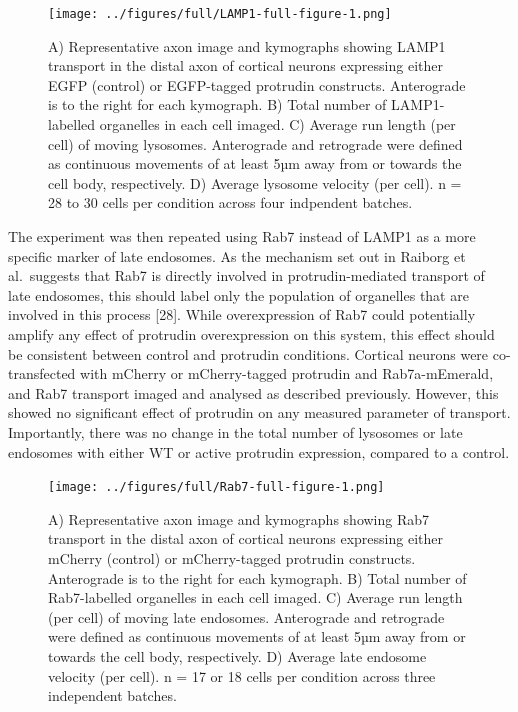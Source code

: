 \documentclass[
  12pt,
  a4paper,
]{book}
\begin{document}
\begin{figure}
\centering
\texttt{[image: ../figures/full/LAMP1-full-figure-1.png]}
\caption{\label{fig:LAMP1-full-figure}A) Representative axon image and kymographs showing LAMP1 transport in the distal axon of cortical neurons expressing either EGFP (control) or EGFP-tagged protrudin constructs. Anterograde is to the right for each kymograph. B) Total number of LAMP1-labelled organelles in each cell imaged. C) Average run length (per cell) of moving lysosomes. Anterograde and retrograde were defined as continuous movements of at least 5µm away from or towards the cell body, respectively. D) Average lysosome velocity (per cell). n = 28 to 30 cells per condition across four indpendent batches.}
\end{figure}

The experiment was then repeated using Rab7 instead of LAMP1 as a more specific marker of late endosomes. As the mechanism set out in Raiborg et al.~suggests that Rab7 is directly involved in protrudin-mediated transport of late endosomes, this should label only the population of organelles that are involved in this process {[}28{]}. While overexpression of Rab7 could potentially amplify any effect of protrudin overexpression on this system, this effect should be consistent between control and protrudin conditions. Cortical neurons were co-transfected with mCherry or mCherry-tagged protrudin and Rab7a-mEmerald, and Rab7 transport imaged and analysed as described previously. However, this showed no significant effect of protrudin on any measured parameter of transport. Importantly, there was no change in the total number of lysosomes or late endosomes with either WT or active protrudin expression, compared to a control.

\begin{figure}
\centering
\texttt{[image: ../figures/full/Rab7-full-figure-1.png]}
\caption{\label{fig:Rab7-full-figure}A) Representative axon image and kymographs showing Rab7 transport in the distal axon of cortical neurons expressing either mCherry (control) or mCherry-tagged protrudin constructs. Anterograde is to the right for each kymograph. B) Total number of Rab7-labelled organelles in each cell imaged. C) Average run length (per cell) of moving late endosomes. Anterograde and retrograde were defined as continuous movements of at least 5µm away from or towards the cell body, respectively. D) Average late endosome velocity (per cell). n = 17 or 18 cells per condition across three independent batches.}
\end{figure}
\end{document}
